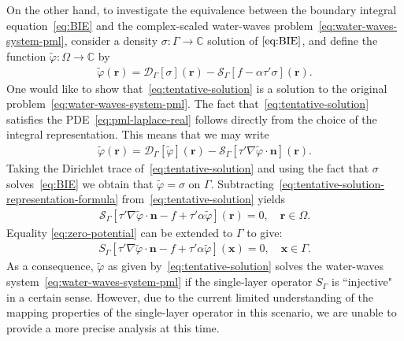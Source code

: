 \documentclass[review,hidelinks,onefignum,onetabnum]{siamart220329}
\newcommand{\C}{\mathbb{C}}
\newcommand{\bn}{\mathbf{n}}
\newcommand{\bx}{\mathbf{x}}
\newcommand{\br}{\boldsymbol{r}}
\newcommand{\tvarphi}{\widetilde \varphi}
\begin{document}
On the other hand, to investigate the equivalence between the boundary integral equation~\cref{eq:BIE} and the complex-scaled water-waves problem~\cref{eq:water-waves-system-pml}, consider a   density $\sigma : \Gamma \to \C$ solution of $\cref{eq:BIE}$, and define the function $\tvarphi: \Omega \to \C$ by
\begin{align}
\label{eq:tentative-solution}
\tvarphi(\br) = \mathcal{D}_{\Gamma}[\sigma](\br) - \mathcal{S}_{\Gamma}[f - \alpha \tau' \sigma](\br).
\end{align}
One would like to show that~\cref{eq:tentative-solution} is a solution to the original problem~\cref{eq:water-waves-system-pml}. The fact that~\cref{eq:tentative-solution} satisfies the PDE~\cref{eq:pml-laplace-real} follows directly from the choice of the integral representation. This means that we may write
\begin{align}
\label{eq:tentative-solution-representation-formula}
\tvarphi(\br) = \mathcal{D}_{\Gamma}[\tvarphi](\br) - \mathcal{S}_{\Gamma}[\tau' \nabla \tvarphi \cdot \bn](\br).
\end{align}
Taking the Dirichlet trace of~\cref{eq:tentative-solution} and using the fact that $\sigma$ solves~\cref{eq:BIE} we obtain that $\tvarphi = \sigma$ on $\Gamma$. Subtracting~\cref{eq:tentative-solution-representation-formula} from~\cref{eq:tentative-solution} yields
\begin{align}
\label{eq:zero-potential}
\mathcal{S}_{\Gamma}[\tau' \nabla \tvarphi \cdot \bn - f + \tau'\alpha \tvarphi](\br) = 0, \quad \br \in \Omega.
\end{align}
Equality \cref{eq:zero-potential} can be extended to $\Gamma$ to give:
\begin{align}   
\label{eq:tentative-solution-representation-formu}
S_{\Gamma}[\tau' \nabla \tvarphi \cdot \bn - f + \tau'\alpha \tvarphi](\bx) = 0, \quad \bx \in \Gamma.
\end{align}
As a consequence, $\tvarphi$ as given by~\cref{eq:tentative-solution} solves the water-waves system~\cref{eq:water-waves-system-pml} if the single-layer operator $S_\Gamma$ is ``injective" in a certain sense. However, due to the current limited understanding of the mapping properties of the single-layer operator in this scenario, we are unable to provide a more precise analysis at this time.
\end{document}
